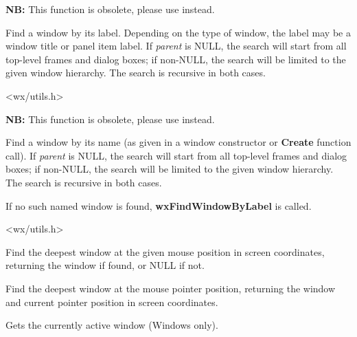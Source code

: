 {\bf NB:} This function is obsolete, please use 
 instead.

Find a window by its label. Depending on the type of window, the label may be a window title
or panel item label. If {\it parent} is NULL, the search will start from all top-level
frames and dialog boxes; if non-NULL, the search will be limited to the given window hierarchy.
The search is recursive in both cases.


<wx/utils.h>

\label{wxfindwindowbyname}


{\bf NB:} This function is obsolete, please use 
 instead.

Find a window by its name (as given in a window constructor or {\bf Create} function call).
If {\it parent} is NULL, the search will start from all top-level
frames and dialog boxes; if non-NULL, the search will be limited to the given window hierarchy.
The search is recursive in both cases.

If no such named window is found, {\bf wxFindWindowByLabel} is called.


<wx/utils.h>

\label{wxfindwindowatpoint}


Find the deepest window at the given mouse position in screen coordinates,
returning the window if found, or NULL if not.

\label{wxfindwindowatpointer}


Find the deepest window at the mouse pointer position, returning the window
and current pointer position in screen coordinates.

\label{wxgetactivewindow}


Gets the currently active window (Windows only).

